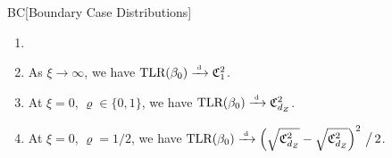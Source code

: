 \begin{propositionp}{BC}[Boundary Case Distributions]\label{prop:lim}
\begin{enumerate}
    \item[]
    \item
    As \(\xi\to \infty\), we have
    \(\textrm{TLR}(\beta_0) \xrightarrow{{\scriptscriptstyle \mathrm{\;d\;}}}
    \mathfrak{C}^2_1\).
    \item
    At \(\xi= 0\), \(\varrho\in \{0,1\}\), we have
    \(\textrm{TLR}(\beta_0) \xrightarrow{{\scriptscriptstyle \mathrm{\;d\;}}}
     \mathfrak{C}^2_{d_Z}\).
    \item
    At  \(\xi= 0\), \(\varrho=1/2\), we have
    \(\textrm{TLR}(\beta_0) \xrightarrow{{\scriptscriptstyle \mathrm{\;d\;}}}
    \left(\sqrt{\mathfrak{C}^2_{d_Z}} -\sqrt{\mathfrak{C}^2_{d_Z}}\right)^2 \,\big/\,2\).
\end{enumerate}
\end{propositionp}

